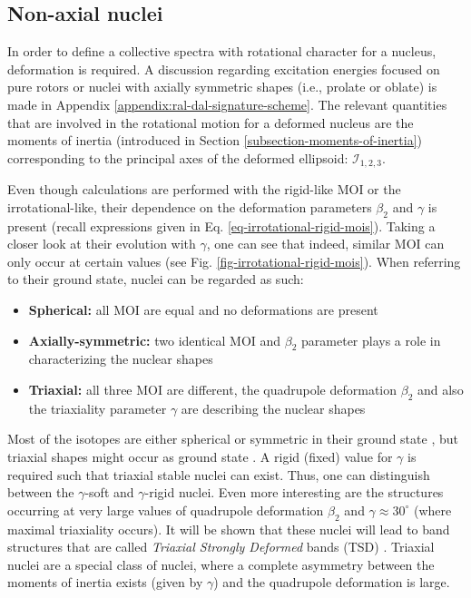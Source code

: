\subsection{Non-axial nuclei}

In order to define a collective spectra with rotational character for a nucleus, deformation is required. A discussion regarding excitation energies focused on pure rotors or nuclei with axially symmetric shapes (i.e., prolate or oblate) is made in Appendix \ref{appendix:ral-dal-signature-scheme}. The relevant quantities that are involved in the rotational motion for a deformed nucleus are the moments of inertia (introduced in Section \ref{subsection-moments-of-inertia}) corresponding to the principal axes of the deformed ellipsoid: $\mathcal{I}_{1,2,3}$.

Even though calculations are performed with the rigid-like MOI or the irrotational-like, their dependence on the deformation parameters $\beta_2$ and $\gamma$ is present (recall expressions given in Eq. \eqref{eq-irrotational-rigid-mois}). Taking a closer look at their evolution with $\gamma$, one can see that indeed, similar MOI can only occur at certain values (see Fig. \ref{fig-irrotational-rigid-mois}). When referring to their ground state, nuclei can be regarded as such:
\begin{itemize}
    \item \textbf{Spherical:} all MOI are equal and no deformations are present
    \item \textbf{Axially-symmetric:} two identical MOI and $\beta_2$ parameter plays a role in characterizing the nuclear shapes 
    \item \textbf{Triaxial:} all three MOI are different, the quadrupole deformation $\beta_2$ and also the triaxiality parameter $\gamma$ are describing the nuclear shapes
\end{itemize}

Most of the isotopes are either spherical or symmetric in their ground state \cite{budaca2018tilted}, but triaxial shapes might occur as ground state \cite{moller2006global}.
A rigid (fixed) value for $\gamma$ is required such that triaxial stable nuclei can exist.
Thus, one can distinguish between the $\gamma$-soft and $\gamma$-rigid nuclei.
Even more interesting are the structures occurring at very large values of quadrupole deformation $\beta_2$ and $\gamma\approx 30^\circ$ (where maximal triaxiality occurs). It will be shown that these nuclei will lead to band structures that are called \emph{Triaxial Strongly Deformed} bands (TSD) \cite{odegaard2001evidence,jensen2002evidence}. Triaxial nuclei are a special class of nuclei, where a complete asymmetry between the moments of inertia exists (given by $\gamma$) and the quadrupole deformation is large.

